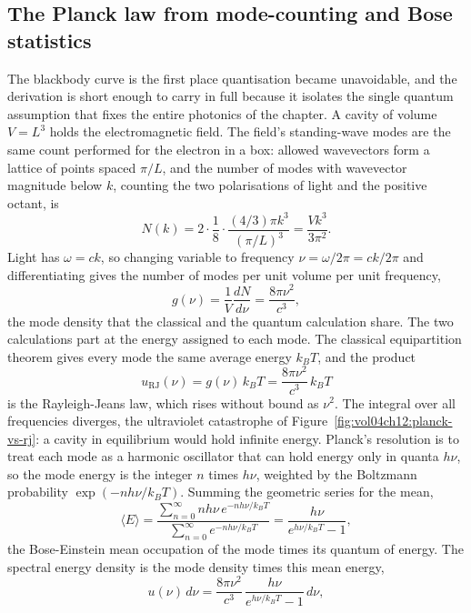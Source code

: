 



\subsection{The Planck law from mode-counting and Bose statistics}

The blackbody curve is the first place quantisation became unavoidable,
and the derivation is short enough to carry in full because it isolates
the single quantum assumption that fixes the entire photonics of the
chapter. A cavity of volume $V = L^{3}$ holds the electromagnetic field.
The field's standing-wave modes are the same count performed for the
electron in a box: allowed wavevectors form a lattice of points spaced
$\pi/L$, and the number of modes with wavevector magnitude below $k$,
counting the two polarisations of light and the positive octant, is
\[
N(k) = 2\cdot\frac{1}{8}\cdot\frac{(4/3)\pi k^{3}}{(\pi/L)^{3}}
     = \frac{V k^{3}}{3\pi^{2}}.
\]
Light has $\omega = ck$, so changing variable to frequency
$\nu = \omega/2\pi = ck/2\pi$ and differentiating gives the number of
modes per unit volume per unit frequency,
\[
g(\nu) = \frac{1}{V}\frac{dN}{d\nu} = \frac{8\pi\nu^{2}}{c^{3}},
\]
the mode density that the classical and the quantum calculation share.
The two calculations part at the energy assigned to each mode. The
classical equipartition theorem gives every mode the same average energy
$k_B T$, and the product
\[
u_{\text{RJ}}(\nu) = g(\nu)\,k_B T = \frac{8\pi\nu^{2}}{c^{3}}\,k_B T
\]
is the Rayleigh-Jeans law, which rises without bound as $\nu^{2}$. The
integral over all frequencies diverges, the ultraviolet catastrophe of
Figure~\ref{fig:vol04ch12:planck-vs-rj}: a cavity in equilibrium would
hold infinite energy. Planck's resolution is to treat each mode as a
harmonic oscillator that can hold energy only in quanta $h\nu$, so the
mode energy is the integer $n$ times $h\nu$, weighted by the Boltzmann
probability $\exp(-nh\nu/k_B T)$. Summing the geometric series for the
mean,
\[
\langle E\rangle
= \frac{\sum_{n=0}^{\infty} n h\nu\,e^{-nh\nu/k_B T}}
       {\sum_{n=0}^{\infty} e^{-nh\nu/k_B T}}
= \frac{h\nu}{e^{h\nu/k_B T} - 1},
\]
the Bose-Einstein mean occupation of the mode times its quantum of
energy. The spectral energy density is the mode density times this mean
energy,
\[
u(\nu)\,d\nu = \frac{8\pi\nu^{2}}{c^{3}}\,
\frac{h\nu}{e^{h\nu/k_B T} - 1}\,d\nu,
\]
